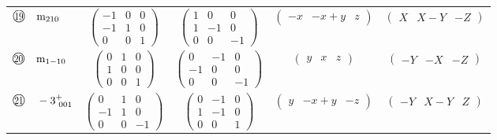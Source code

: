 \documentclass[fleqn,10pt,landscape]{jsarticle}
\begin{document}
\begin{center}
\begin{longtable}{lcccc}
$ {\ooalign{\hfil\resizebox{.8\width}{\height}{19}\hfil\crcr\raise.1ex\hbox{\large$\bigcirc$}}}\quad {\rm m}_{210} $ & $ \begin{pmatrix} -1 & 0 & 0 \\ -1 & 1 & 0 \\ 0 & 0 & 1 \end{pmatrix} $ & $ \begin{pmatrix} 1 & 0 & 0 \\ 1 & -1 & 0 \\ 0 & 0 & -1 \end{pmatrix} $ & $ \begin{pmatrix} - x & - x + y & z \end{pmatrix} $ & $ \begin{pmatrix} X & X - Y & - Z \end{pmatrix} $ \\
$ {\ooalign{\hfil\resizebox{.8\width}{\height}{20}\hfil\crcr\raise.1ex\hbox{\large$\bigcirc$}}}\quad {\rm m}_{1-10} $ & $ \begin{pmatrix} 0 & 1 & 0 \\ 1 & 0 & 0 \\ 0 & 0 & 1 \end{pmatrix} $ & $ \begin{pmatrix} 0 & -1 & 0 \\ -1 & 0 & 0 \\ 0 & 0 & -1 \end{pmatrix} $ & $ \begin{pmatrix} y & x & z \end{pmatrix} $ & $ \begin{pmatrix} - Y & - X & - Z \end{pmatrix} $ \\
$ {\ooalign{\hfil\resizebox{.8\width}{\height}{21}\hfil\crcr\raise.1ex\hbox{\large$\bigcirc$}}}\quad -3^{+}_{\,\,001} $ & $ \begin{pmatrix} 0 & 1 & 0 \\ -1 & 1 & 0 \\ 0 & 0 & -1 \end{pmatrix} $ & $ \begin{pmatrix} 0 & -1 & 0 \\ 1 & -1 & 0 \\ 0 & 0 & 1 \end{pmatrix} $ & $ \begin{pmatrix} y & - x + y & - z \end{pmatrix} $ & $ \begin{pmatrix} - Y & X - Y & Z \end{pmatrix} $ \\

\end{longtable}
\end{center}
\end{document}
